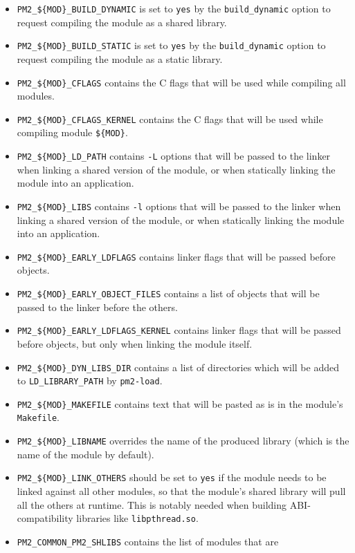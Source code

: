 \documentclass[11pt, a4paper ,twoside]{article}
\begin{document}
\begin{itemize}
\item \verb+PM2_${MOD}_BUILD_DYNAMIC+ is set to \verb+yes+ by the
\verb+build_dynamic+ option to request compiling the module as a shared
library.
\item \verb+PM2_${MOD}_BUILD_STATIC+ is set to \verb+yes+ by the
\verb+build_dynamic+ option to request compiling the module as a static
library.
\item \verb+PM2_${MOD}_CFLAGS+ contains the C flags that will be used
while compiling all modules.
\item \verb+PM2_${MOD}_CFLAGS_KERNEL+ contains the C flags that will be
used while compiling module \verb+${MOD}+.
\item \verb+PM2_${MOD}_LD_PATH+ contains \verb+-L+ options that will be
passed to the linker when linking a shared version of the module, or
when statically linking the module into an application.
\item \verb+PM2_${MOD}_LIBS+ contains \verb+-l+ options that will be
passed to the linker when linking a shared version of the module, or
when statically linking the module into an application.
\item \verb+PM2_${MOD}_EARLY_LDFLAGS+ contains linker flags that will be
passed before objects.
\item \verb+PM2_${MOD}_EARLY_OBJECT_FILES+ contains a list of objects
that will be passed to the linker before the others.
\item \verb+PM2_${MOD}_EARLY_LDFLAGS_KERNEL+ contains linker flags that
will be passed before objects, but only when linking the module itself.
\item \verb+PM2_${MOD}_DYN_LIBS_DIR+ contains a list of directories
which will be added to \verb+LD_LIBRARY_PATH+ by \verb+pm2-load+.
\item \verb+PM2_${MOD}_MAKEFILE+ contains text that will be pasted as is
in the module's \verb+Makefile+.
\item \verb+PM2_${MOD}_LIBNAME+ overrides the name of the produced
library (which is the name of the module by default).
\item \verb+PM2_${MOD}_LINK_OTHERS+ should be set to \verb+yes+ if the
module needs to be linked against all other modules, so that the
module's shared library will pull all the others at runtime.  This is
notably needed when building ABI-compatibility libraries like
\verb+libpthread.so+.
\item \verb+PM2_COMMON_PM2_SHLIBS+ contains the list of modules that are

\end{itemize}
\end{document}
